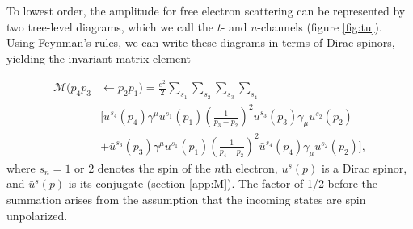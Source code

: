 \documentclass[twoside,twocolumn,9pt]{article}
\begin{document}
To lowest order, the amplitude for free electron scattering can be represented
by two tree-level diagrams, which we call the $t$- and $u$-channels (figure
\ref{fig:tu}).
Using Feynman's rules, \cite{Peskin1995, Lancaster2014} we can write these
diagrams in terms of Dirac spinors, yielding the invariant matrix element

\begin{equation} 
  \label{eq:M} 
  \begin{aligned} 
    \mathcal{M}(p_4p_3&\leftarrow
    p_2p_1) 
    =
    \frac{e^2}{2} \sum_{s_1}\sum_{s_2}\sum_{s_3}\sum_{s_4} 
    \\& \bigg[
      \bar{u}^{s_4}\left(p_4\right)\gamma^{\mu}u^{s_1}\left(p_1\right)
      \left(\frac{1}{p_3 - p_2}\right)^2
      \bar{u}^{s_3}\left(p_3\right)\gamma_{\mu}u^{s_2}\left(p_2\right)
      \\&+ 
      \bar{u}^{s_3}\left(p_3\right)\gamma^{\mu}u^{s_1}\left(p_1\right)
      \left(\frac{1}{p_4 - p_2}\right)^2
      \bar{u}^{s_4}\left(p_4\right)\gamma_{\mu}u^{s_2}\left(p_2\right)
    \bigg],
  \end{aligned} 
\end{equation}
%
where $s_n = 1\text{ or }2$ denotes the spin of the $n$th electron, $u^s(p)$
is a Dirac spinor, and $\bar{u}^s(p)$ is its conjugate (section \ref{app:M}).
The factor of 1/2 before the summation arises from the assumption that the
incoming states are spin unpolarized.
\end{document}
